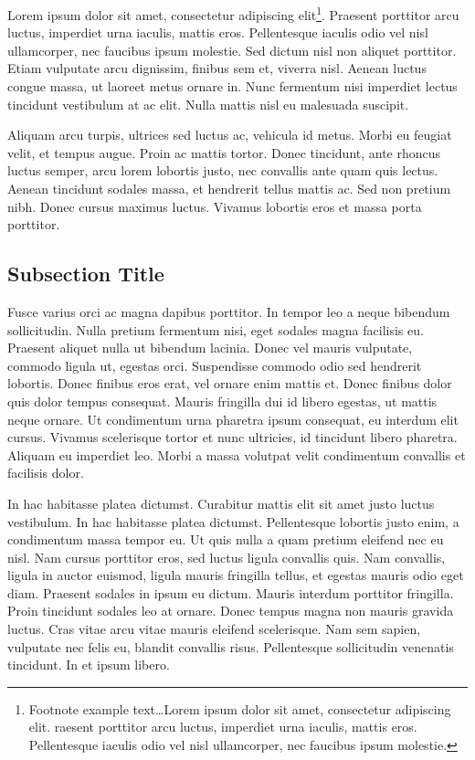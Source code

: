 \documentclass[
	11pt, %
	fleqn, %
	a4paper, %
]{LegrandOrangeBook}
\begin{document}
Lorem ipsum dolor sit amet, consectetur adipiscing elit\footnote{Footnote example text\ldots Lorem ipsum dolor sit amet, consectetur adipiscing elit.
raesent porttitor arcu luctus, imperdiet urna iaculis, mattis eros.
Pellentesque iaculis odio vel nisl ullamcorper, nec faucibus ipsum molestie.}.
Praesent porttitor arcu luctus, imperdiet urna iaculis, mattis eros.
Pellentesque iaculis odio vel nisl ullamcorper, nec faucibus ipsum molestie.
Sed dictum nisl non aliquet porttitor.
Etiam vulputate arcu dignissim, finibus sem et, viverra nisl.
Aenean luctus congue massa, ut laoreet metus ornare in.
Nunc fermentum nisi imperdiet lectus tincidunt vestibulum at ac elit.
Nulla mattis nisl eu malesuada suscipit.

Aliquam arcu turpis, ultrices sed luctus ac, vehicula id metus.
Morbi eu feugiat velit, et tempus augue.
Proin ac mattis tortor.
Donec tincidunt, ante rhoncus luctus semper, arcu lorem lobortis justo, nec convallis ante quam quis lectus.
Aenean tincidunt sodales massa, et hendrerit tellus mattis ac.
Sed non pretium nibh.
Donec cursus maximus luctus.
Vivamus lobortis eros et massa porta porttitor.


\subsection{Subsection Title}

Fusce varius orci ac magna dapibus porttitor.
In tempor leo a neque bibendum sollicitudin.
Nulla pretium fermentum nisi, eget sodales magna facilisis eu.
Praesent aliquet nulla ut bibendum lacinia.
Donec vel mauris vulputate, commodo ligula ut, egestas orci.
Suspendisse commodo odio sed hendrerit lobortis.
Donec finibus eros erat, vel ornare enim mattis et.
Donec finibus dolor quis dolor tempus consequat.
Mauris fringilla dui id libero egestas, ut mattis neque ornare.
Ut condimentum urna pharetra ipsum consequat, eu interdum elit cursus.
Vivamus scelerisque tortor et nunc ultricies, id tincidunt libero pharetra.
Aliquam eu imperdiet leo.
Morbi a massa volutpat velit condimentum convallis et facilisis dolor.

In hac habitasse platea dictumst.
Curabitur mattis elit sit amet justo luctus vestibulum.
In hac habitasse platea dictumst.
Pellentesque lobortis justo enim, a condimentum massa tempor eu.
Ut quis nulla a quam pretium eleifend nec eu nisl.
Nam cursus porttitor eros, sed luctus ligula convallis quis.
Nam convallis, ligula in auctor euismod, ligula mauris fringilla tellus, et egestas mauris odio eget diam.
Praesent sodales in ipsum eu dictum.
Mauris interdum porttitor fringilla.
Proin tincidunt sodales leo at ornare.
Donec tempus magna non mauris gravida luctus.
Cras vitae arcu vitae mauris eleifend scelerisque.
Nam sem sapien, vulputate nec felis eu, blandit convallis risus.
Pellentesque sollicitudin venenatis tincidunt.
In et ipsum libero.
\end{document}
